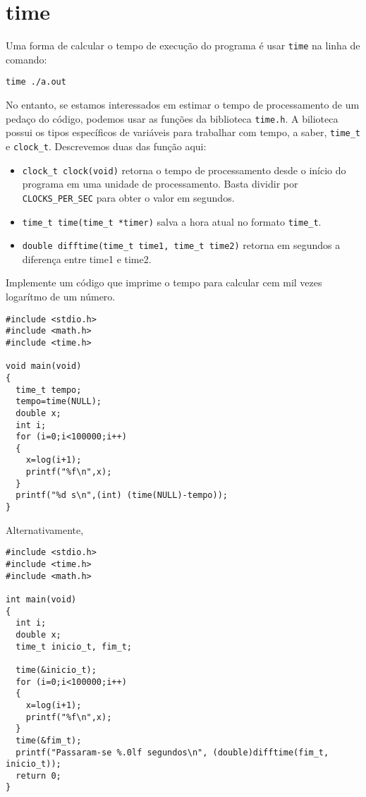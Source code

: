 \section{time}
Uma forma de calcular o tempo de execução do programa é usar \verb|time| na linha de comando:
\begin{verbatim}
time ./a.out
\end{verbatim}
No entanto, se estamos interessados em estimar o tempo de processamento de um pedaço do código, podemos usar as funções da biblioteca \verb|time.h|. A bilioteca possui os tipos específicos de variáveis para trabalhar com tempo, a saber, \verb|time_t| e \verb|clock_t|. Descrevemos duas das função aqui:
\begin{itemize}
 \item \verb|clock_t clock(void)| retorna o tempo de processamento desde o início do programa em uma unidade de processamento. Basta dividir por \verb|CLOCKS_PER_SEC| para obter o valor em segundos.
 \item \verb|time_t time(time_t *timer)| salva a hora atual no formato \verb|time_t|.
 \item \verb|double difftime(time_t time1, time_t time2)| retorna em segundos a diferença entre time1 e time2.
\end{itemize}
\begin{ex}
Implemente um código que imprime o tempo para calcular cem mil vezes logarítmo de um número.
\end{ex}
\begin{verbatim}
#include <stdio.h>
#include <math.h>
#include <time.h>

void main(void)
{
  time_t tempo;
  tempo=time(NULL);
  double x;
  int i;
  for (i=0;i<100000;i++) 
  {
    x=log(i+1);
    printf("%f\n",x);
  }
  printf("%d s\n",(int) (time(NULL)-tempo));
}  
\end{verbatim}
Alternativamente,
\begin{verbatim}
#include <stdio.h>
#include <time.h>
#include <math.h>

int main(void)
{
  int i;
  double x;
  time_t inicio_t, fim_t;

  time(&inicio_t);
  for (i=0;i<100000;i++) 
  {
    x=log(i+1);
    printf("%f\n",x);
  }
  time(&fim_t);
  printf("Passaram-se %.0lf segundos\n", (double)difftime(fim_t, inicio_t));
  return 0;
}
\end{verbatim}

